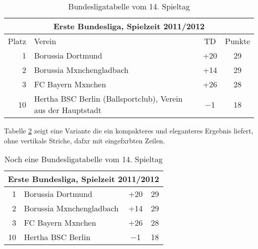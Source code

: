             \begin{table}[htp] 
                \centering
                \begin{tabular}{r|p{6cm}|c|c}  %
                    \toprule
                    \multicolumn{4}{c}{\large\bfseries Erste Bundesliga, Spielzeit 2011/2012}\\ \midrule
                        Platz & Verein & TD & Punkte\\ \midrule
                        1 & Borussia Dortmund & +20 & 29\\ \midrule
                        2 & Borussia Mxnchengladbach & +14 & 29\\ \midrule
                        3 & FC Bayern Mxnchen & +26 & 28\\ \midrule
                        10 & Hertha BSC Berlin (Ballsportclub), Verein aus der Hauptstadt & $-$1 & 18 \\
                    \bottomrule
                \end{tabular}
                \caption{Bundesligatabelle vom 14. Spieltag}\label{t_buli}
            \end{table}

            Tabelle \ref{t_buli2} zeigt eine Variante die ein kompakteres und eleganteres Ergebnis liefert, ohne vertikale Striche, dafxr mit eingefxrbten Zeilen.

            \begin{table}[htp] 
                \centering
                \begin{tabular}{rlcc}  %
                    \toprule
                    \multicolumn{4}{c}{\large\sffamily Erste Bundesliga, Spielzeit 2011/2012}\\ \midrule
                        1 & Borussia Dortmund & +20 & 29\\ 
                        2 & Borussia Mxnchengladbach & +14 & 29\\
                        3 & FC Bayern Mxnchen & +26 & 28\\
                        10 & Hertha BSC Berlin & $-$1 & 18 \\ \bottomrule
                \end{tabular}
                \caption{Noch eine Bundesligatabelle vom 14. Spieltag}\label{t_buli2}
            \end{table}

